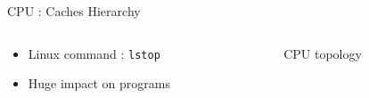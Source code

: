 \begin{Frame}{CPU : Caches Hierarchy}
 \begin{columns}[t]
  \begin{column}{\BW}
    \begin{block}{}
      \begin{itemize}
        \item Linux command : \texttt{lstop}
        \item Huge impact on programs
      \end{itemize}
    \end{block}
  \end{column}
  \begin{column}{\BW}
    \begin{block}{CPU topology}
    \end{block}
  \end{column}

 \end{columns}
\end{Frame}
